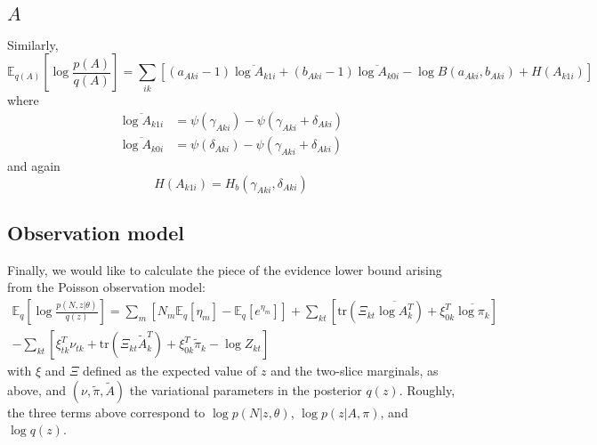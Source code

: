 \documentclass[11pt]{article}
\begin{document}
\subsection{$A$} 
Similarly,
\begin{equation}
    \mathbb{E}_{q(A)} \left[\log \frac{p(A)}{q(A)} \right] = 
\sum_{ik} \left[ (a_{Aki} - 1) \overline{\log A_{k1i}} + (b_{Aki} - 1) \overline{\log A_{k0i}} - \log B(a_{Aki}, b_{Aki}) + H(A_{k1i}) \right]
\end{equation}
where 
\begin{align}
    \overline{\log A_{k1i}} &= \psi(\gamma_{Aki}) - \psi(\gamma_{Aki} + \delta_{Aki}) \\
    \overline{\log A_{k0i}} &= \psi(\delta_{Aki}) - \psi(\gamma_{Aki} + \delta_{Aki})
\end{align}
and again
\begin{equation}
    H(A_{k1i}) = H_b(\gamma_{Aki}, \delta_{Aki})
\end{equation}

\subsection{Observation model}
Finally, we would like to calculate the piece of the evidence lower bound arising from the Poisson observation model:
\begin{multline}
    \label{obsmodel}
    \mathbb{E}_q \left[ \log \frac{p(N, z|\theta)}{q(z)} \right] =
    \sum_{m} \left[
    N_{m} \mathbb{E}_q [\eta_m]
    - \mathbb{E}_q[e^{\eta_m}] \right]
    + \sum_{kt} \left[\mathrm{tr}\left(\Xi_{kt} \overline{\log A_k^T}\right) + \xi_{0k}^T \overline{\log \pi_k} \right] \\
    - \sum_{kt} \left[ \xi_{tk}^T \nu_{tk} + \mathrm{tr}\left(\Xi_{kt} \tilde{A}_k^T\right) + \xi_{0k}^T \tilde{\pi}_k - \log Z_{kt} \right]
\end{multline}
with $\xi$ and $\Xi$ defined as the expected value of $z$ and the two-slice marginals, as above, and $(\nu, \tilde{\pi}, \tilde{A})$ the variational parameters in the posterior $q(z)$. Roughly, the three terms above correspond to $\log p(N|z, \theta)$, $\log p(z|A, \pi)$, and $\log q(z)$.
\end{document}
